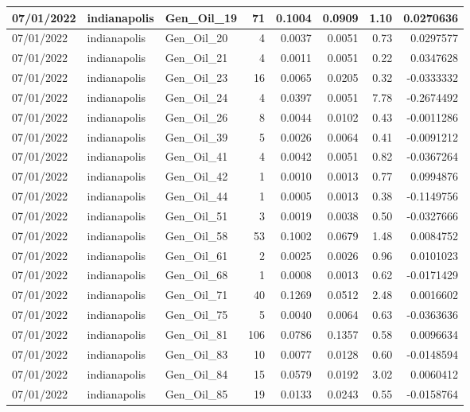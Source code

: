 \documentclass[
  letterpaper,
  DIV=11,
  numbers=noendperiod]{scrartcl}
\begin{document}
\begin{tabular}{l|l|l|r|r|r|r|r}
\hline
07/01/2022 & indianapolis & Gen\_Oil\_19 & 71 & 0.1004 & 0.0909 & 1.10 & 0.0270636\\
\hline
07/01/2022 & indianapolis & Gen\_Oil\_20 & 4 & 0.0037 & 0.0051 & 0.73 & 0.0297577\\
\hline
07/01/2022 & indianapolis & Gen\_Oil\_21 & 4 & 0.0011 & 0.0051 & 0.22 & 0.0347628\\
\hline
07/01/2022 & indianapolis & Gen\_Oil\_23 & 16 & 0.0065 & 0.0205 & 0.32 & -0.0333332\\
\hline
07/01/2022 & indianapolis & Gen\_Oil\_24 & 4 & 0.0397 & 0.0051 & 7.78 & -0.2674492\\
\hline
07/01/2022 & indianapolis & Gen\_Oil\_26 & 8 & 0.0044 & 0.0102 & 0.43 & -0.0011286\\
\hline
07/01/2022 & indianapolis & Gen\_Oil\_39 & 5 & 0.0026 & 0.0064 & 0.41 & -0.0091212\\
\hline
07/01/2022 & indianapolis & Gen\_Oil\_41 & 4 & 0.0042 & 0.0051 & 0.82 & -0.0367264\\
\hline
07/01/2022 & indianapolis & Gen\_Oil\_42 & 1 & 0.0010 & 0.0013 & 0.77 & 0.0994876\\
\hline
07/01/2022 & indianapolis & Gen\_Oil\_44 & 1 & 0.0005 & 0.0013 & 0.38 & -0.1149756\\
\hline
07/01/2022 & indianapolis & Gen\_Oil\_51 & 3 & 0.0019 & 0.0038 & 0.50 & -0.0327666\\
\hline
07/01/2022 & indianapolis & Gen\_Oil\_58 & 53 & 0.1002 & 0.0679 & 1.48 & 0.0084752\\
\hline
07/01/2022 & indianapolis & Gen\_Oil\_61 & 2 & 0.0025 & 0.0026 & 0.96 & 0.0101023\\
\hline
07/01/2022 & indianapolis & Gen\_Oil\_68 & 1 & 0.0008 & 0.0013 & 0.62 & -0.0171429\\
\hline
07/01/2022 & indianapolis & Gen\_Oil\_71 & 40 & 0.1269 & 0.0512 & 2.48 & 0.0016602\\
\hline
07/01/2022 & indianapolis & Gen\_Oil\_75 & 5 & 0.0040 & 0.0064 & 0.63 & -0.0363636\\
\hline
07/01/2022 & indianapolis & Gen\_Oil\_81 & 106 & 0.0786 & 0.1357 & 0.58 & 0.0096634\\
\hline
07/01/2022 & indianapolis & Gen\_Oil\_83 & 10 & 0.0077 & 0.0128 & 0.60 & -0.0148594\\
\hline
07/01/2022 & indianapolis & Gen\_Oil\_84 & 15 & 0.0579 & 0.0192 & 3.02 & 0.0060412\\
\hline
07/01/2022 & indianapolis & Gen\_Oil\_85 & 19 & 0.0133 & 0.0243 & 0.55 & -0.0158764\\

\end{tabular}
\end{document}
